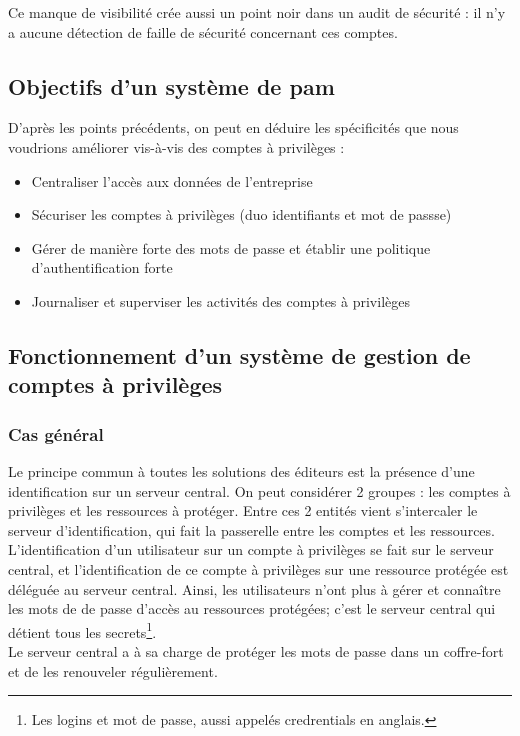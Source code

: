Ce manque de  visibilité crée aussi un point noir dans un audit de sécurité : il n'y a aucune détection de faille de sécurité concernant ces comptes.

\subsection{Objectifs d'un système de \gls{pam}}

D'après les points précédents, on peut en déduire les spécificités que nous voudrions améliorer vis-à-vis des comptes à privilèges :
\begin{itemize}
	\item Centraliser l’accès aux données de l’entreprise
 	\item Sécuriser les comptes à privilèges (duo identifiants et mot de passse)
 	\item Gérer de manière forte des mots de passe et établir une politique d’authentification forte
	\item Journaliser et superviser les activités des comptes à privilèges
\end{itemize}

\subsection{Fonctionnement d'un système de gestion de comptes à privilèges}

\subsubsection{Cas général}
Le principe commun à toutes les solutions des éditeurs est la présence d'une identification sur un serveur central. On peut considérer 2 groupes : les comptes à privilèges et les ressources à protéger. Entre ces 2 entités vient s'intercaler le serveur d'identification, qui fait la passerelle entre les comptes et les ressources.\\
L'identification d'un utilisateur sur un compte à privilèges se fait sur le serveur central, et l'identification de ce compte à privilèges sur une ressource protégée est déléguée au serveur central. Ainsi, les utilisateurs n'ont plus à gérer et connaître les mots de de passe d'accès au ressources protégées; c'est le serveur central qui détient tous les secrets\footnote{Les logins et mot de passe, aussi appelés \og credrentials \fg{} en anglais.}.\\
Le serveur central a à sa charge de protéger les mots de passe dans un coffre-fort et de les renouveler régulièrement.

